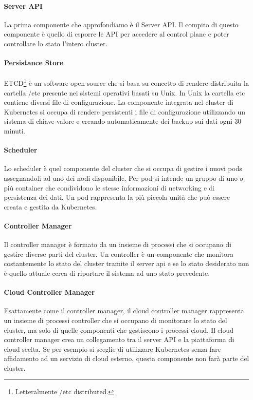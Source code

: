 \paragraph{Server API}
La prima componente che approfondiamo è il Server API. Il compito di questo componente è quello di esporre le API per accedere al control plane e poter controllare lo stato l'intero cluster. 

\paragraph{Persistance Store}
ETCD\footnote{Letteralmente /etc distributed.} è un software open source che si basa su concetto di rendere distribuita la cartella /etc presente nei sistemi operativi basati su Unix. In Unix la cartella etc contiene diversi file di configurazione. La componente integrata nel cluster di Kubernetes si occupa di rendere persistenti i file di configurazione utilizzando un sistema di chiave-valore e creando automaticamente dei backup sui dati ogni 30 minuti.

\paragraph{Scheduler}
Lo scheduler è quel componente del cluster che si occupa di gestire i nuovi pods assegnandoli ad uno dei nodi disponibile. Per pod si intende un gruppo di uno o più container che condividono le stesse informazioni di networking e di persistenza dei dati. Un pod rappresenta la più piccola unità che può essere creata e gestita da Kubernetes.

\paragraph{Controller Manager}
Il controller manager è formato da un insieme di processi che si occupano di gestire diverse parti del cluster. Un controller è un componente che  monitora costantemente lo stato del cluster tramite il server api e se lo stato desiderato non è quello attuale cerca di riportare il sistema ad uno stato precedente.

\paragraph{Cloud Controller Manager}
Esattamente come il controller manager, il cloud controller manager rappresenta un insieme di processi controller che si occupano di monitorare lo stato del cluster, ma solo di quelle componenti che gestiscono i processi cloud. Il cloud controller manager crea un collegamento tra il server API e la piattaforma di cloud scelta. Se per esempio si sceglie di utilizzare Kubernetes senza fare affidamento ad un servizio di cloud esterno, questa componente non farà parte del cluster.

